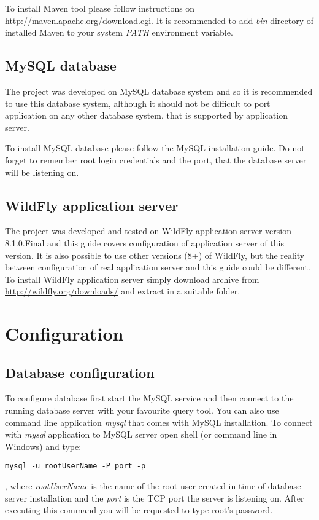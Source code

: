 \documentclass[12pt,a4paper]{article}
\begin{document}
To install Maven tool please follow instructions on \url{http://maven.apache.org/download.cgi}. It is recommended to add \textit{bin} directory of installed Maven to your system \textit{PATH} environment variable.

\subsection{MySQL database}
The project was developed on MySQL database system and so it is recommended to use this database system, although it should not be difficult to port application on any other database system, that is supported by application server.

To install MySQL database please follow the \href{http://dev.mysql.com/doc/refman/5.6/en/installing.html}{MySQL installation guide}. Do not forget to remember root login credentials and the port, that the database server will be listening on.

\subsection{WildFly application server}
The project was developed and tested on WildFly application server version 8.1.0.Final and this guide covers configuration of application server of this version. It is also possible to use other versions (8+) of WildFly, but the reality between configuration of real application server and this guide could be different.
To install WildFly application server simply download archive from \url{http://wildfly.org/downloads/} and extract in a suitable folder.

\section{Configuration}
\subsection{Database configuration}
To configure database first start the MySQL service and then connect to the running database server with your favourite query tool. You can also use command line application \textit{mysql} that comes with MySQL installation.
To connect with \textit{mysql} application to MySQL server
open shell (or command line in Windows) and type:
\begin{lstlisting}
mysql -u rootUserName -P port -p
\end{lstlisting}
, where \textit{rootUserName} is the name of the root user created in time of database server installation and the \textit{port} is the TCP port the server is listening on.
After executing this command you will be requested to type root's password.
\end{document}
